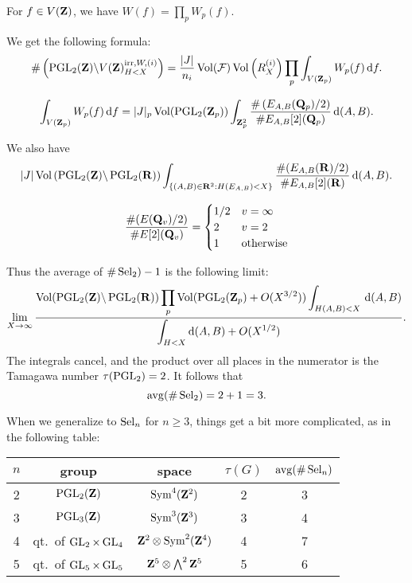 \begin{prop}
For $f\in V(\mathbf{Z})$, we have $W(f) = \prod_p W_p(f)$. 
\end{prop}

We get the following formula: 
\[
  \#\left(\operatorname{PGL}_2(\mathbf{Z})\backslash V(\mathbf{Z})_{H<X}^{\mathrm{irr},W,(i)}\right) = \frac{|J|}{n_i} \operatorname{Vol}(\mathcal{F}) \operatorname{Vol}\left(R_X^{(i)}\right) \prod_p \int_{V(\mathbf{Z}_p)} W_p(f)\, \mathrm{d} f .
\]

\begin{prop}
\[
  \int_{V(\mathbf{Z}_p)}W_p(f)\, \mathrm{d} f = |J|_p \operatorname{Vol}(\operatorname{PGL}_2(\mathbf{Z}_p)) \int_{\mathbf{Z}_p^2} \frac{\#\left(E_{A,B}(\mathbf{Q}_p)/2\right)}{\#E_{A,B}[2](\mathbf{Q}_p)}\, \mathrm{d} (A,B) .
\]
\end{prop}

We also have 
\[
  |J|\operatorname{Vol}\left(\operatorname{PGL}_2(\mathbf{Z})\backslash \operatorname{PGL}_2(\mathbf{R})\right) \int_{\{(A,B)\in\mathbf{R}^2:H(E_{A,B})<X\}} \frac{\#(E_{A,B}(\mathbf{R})/2)}{\# E_{A,B}[2](\mathbf{R})}\, \mathrm{d}(A,B) .
\]

\begin{prop}
\[
  \frac{\#(E(\mathbf{Q}_v)/2)}{\# E[2](\mathbf{Q}_v)} = \begin{cases} 1/2 & v=\infty \\ 2 & v=2 \\ 1 & \text{otherwise} \end{cases}
\]
\end{prop}

Thus the average of $\#\operatorname{Sel}_2)-1$ is the following limit: 
\[
  \lim_{X\to \infty} \frac{\displaystyle\operatorname{Vol}(\operatorname{PGL}_2(\mathbf{Z})\backslash \operatorname{PGL}_2(\mathbf{R})) \prod_p \operatorname{Vol}(\operatorname{PGL}_2(\mathbf{Z}_p) + O(X^{3/2})) \int_{H(A,B)<X}\,\mathrm{d}(A,B)}{\displaystyle\int_{H<X} \mathrm{d}(A,B) + O(X^{1/2})} .
\]
The integrals cancel, and the product over all places in the numerator is the 
Tamagawa number $\tau(\operatorname{PGL}_2)=2$. It follows that 
\[
  \operatorname{avg}(\#\operatorname{Sel}_2)=2+1=3 .
\]

When we generalize to $\operatorname{Sel}_n$ for $n\geqslant 3$, things get a bit more 
complicated, as in the following table: 
\begin{center}
\begin{tabular}{c|c|c|c|c}
$n$ & group & space & $\tau(G)$ & $\operatorname{avg}(\#\operatorname{Sel}_n)$ \\ \hline
2 & $\operatorname{PGL}_2(\mathbf{Z})$ & $\operatorname{Sym}^4(\mathbf{Z}^2)$ & 2 & 3\\ 
3 & $\operatorname{PGL}_3(\mathbf{Z})$ & $\operatorname{Sym}^3(\mathbf{Z}^3)$ & 3 & 4\\ 
4 & qt.~of $\operatorname{GL}_2\times \operatorname{GL}_4$ & $\mathbf{Z}^2\otimes\operatorname{Sym}^2(\mathbf{Z}^4)$ & 4 & 7\\
5 & qt.~of $\operatorname{GL}_5\times \operatorname{GL}_5$ & $\mathbf{Z}^5\otimes \bigwedge^2 \mathbf{Z}^5$ & 5 & 6
\end{tabular}
\end{center}




